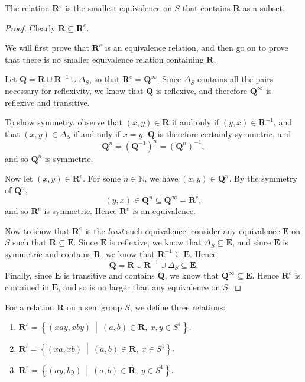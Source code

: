 \begin{lemma}
  \label{lem:re}
  The relation $\mathbf{R}^e$ is the smallest equivalence on $S$ that contains
  $\mathbf{R}$ as a subset.
  \begin{proof}
    Clearly $\mathbf{R} \subseteq \mathbf{R}^e$.

    We will first prove that $\mathbf{R}^e$ is an equivalence relation, and then
    go on to prove that there is no smaller equivalence relation containing
    $\mathbf{R}$.

    Let $\mathbf{Q} = \mathbf{R} \cup \mathbf{R}^{-1} \cup \Delta_S$, so that
    $\mathbf{R}^e = \mathbf{Q}^\infty$.  Since $\Delta_S$ contains all the
    pairs necessary for reflexivity, we know that $\mathbf{Q}$ is reflexive,
    and therefore $\mathbf{Q}^\infty$ is reflexive and transitive.

    To show symmetry, observe that $(x,y) \in \mathbf{R}$ if and only if $(y,x)
    \in \mathbf{R}^{-1}$, and that $(x,y) \in \Delta_S$ if and only if $x=y$.
    $\mathbf{Q}$ is therefore certainly symmetric, and
    $$\mathbf{Q}^n = (\mathbf{Q}^{-1})^n = (\mathbf{Q}^n)^{-1},$$
    and so $\mathbf{Q}^n$ is symmetric.

    Now let $(x,y) \in \mathbf{R}^e$.  For some $n \in \mathbb{N}$, we have
    $(x,y) \in \mathbf{Q}^n$.  By the symmetry of $\mathbf{Q}^n$,
    $$(y,x) \in \mathbf{Q}^n \subseteq \mathbf{Q}^\infty = \mathbf{R}^e,$$
    and so $\mathbf{R}^e$ is symmetric.  Hence $\mathbf{R}^e$ is an equivalence.

    Now to show that $\mathbf{R}^e$ is the \textit{least} such equivalence,
    consider any equivalence $\mathbf{E}$ on $S$ such that $\mathbf{R} \subseteq
    \mathbf{E}$.  Since $\mathbf{E}$ is reflexive, we know that $\Delta_S
    \subseteq \mathbf{E}$, and since $\mathbf{E}$ is symmetric and contains
    $\mathbf{R}$, we know that $\mathbf{R}^{-1} \subseteq \mathbf{E}$.  Hence
    $$\mathbf{Q}=\mathbf{R}\cup\mathbf{R}^{-1}\cup\Delta_S \subseteq \mathbf{E}.$$
    Finally, since $\mathbf{E}$ is transitive and contains $\mathbf{Q}$, we know
    that $\mathbf{Q}^\infty \subseteq \mathbf{E}$.  Hence $\mathbf{R}^e$ is
    contained in $\mathbf{E}$, and so is no larger than any equivalence on $S$.
  \end{proof}
\end{lemma}

\begin{definition}
  \label{def:rc}
  For a relation $\mathbf{R}$ on a semigroup $S$, we define three relations:
  \begin{enumerate}
  \item
    $\mathbf{R}^c = \left\{(xay, xby) ~\middle|~ (a,b) \in \mathbf{R},~x,y \in
      S^1\right\}$.
  \item
    $\mathbf{R}^l = \left\{(xa, xb) ~\middle|~ (a,b) \in \mathbf{R},~x \in
      S^1\right\}$.
  \item
    $\mathbf{R}^r = \left\{(ay, by) ~\middle|~ (a,b) \in \mathbf{R},~y \in
      S^1\right\}$.
  \end{enumerate}
\end{definition}

